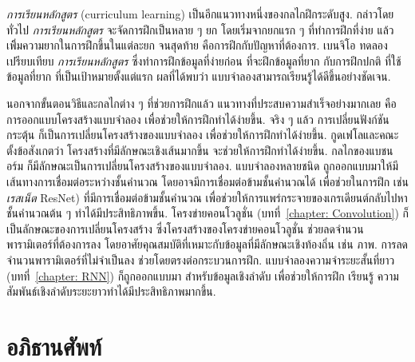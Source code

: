\textit{การเรียนหลักสูตร} (curriculum learning\cite{Bengio2009b}) เป็นอีกแนวทางหนึ่งของกลไกฝึกระดับสูง.
กล่าวโดยทั่วไป
\textit{การเรียนหลักสูตร} จะจัดการฝึกเป็นหลาย ๆ ยก 
โดยเริ่มจากยกแรก ๆ ที่ทำการฝึกที่ง่าย แล้วเพิิ่มความยากในการฝึกขึ้นในแต่ละยก
จนสุดท้าย คือการฝึกกับปัญหาที่ต้องการ.
เบนจิโอ\cite{Bengio2009b}
ทดลองเปรียบเทียบ
\textit{การเรียนหลักสูตร}
ซึ่งทำการฝึกข้อมูลที่ง่ายก่อน ที่จะฝึกข้อมูลที่ยาก
กับการฝึกปกติ ที่ใช้ข้อมูลที่ยาก ที่เป็นเป้าหมายตั้งแต่แรก
ผลที่ได้พบว่า แบบจำลองสามารถเรียนรู้ได้ดีขึ้นอย่างชัดเจน.

นอกจากขั้นตอนวิธีและกลไกต่าง ๆ ที่ช่วยการฝึกแล้ว
แนวทางที่ประสบความสำเร็จอย่างมากเลย 
คือ การออกแบบโครงสร้างแบบจำลอง เพื่อช่วยให้การฝึกทำได้ง่ายขึ้น.
จริง ๆ แล้ว การเปลี่ยนฟังก์ชันกระตุ้น ก็เป็นการเปลี่ยนโครงสร้างของแบบจำลอง
เพื่อช่วยให้การฝึกทำได้ง่ายขึ้น.
กูดเฟโลและคณะ\cite{GoodfellowEtAl2016}
ตั้งข้อสังเกตว่า
โครงสร้างที่มีลักษณะเชิงเส้นมากขึ้น จะช่วยให้การฝึกทำได้ง่ายขึ้น.
กลไกของแบชนอร์ม ก็มีลักษณะเป็นการเปลี่ยนโครงสร้างของแบบจำลอง.
แบบจำลองหลายชนิด ถูกออกแบบมาให้มีเส้นทางการเชื่อมต่อระหว่างชั้นคำนวณ โดยอาจมีการเชื่อมต่อข้ามชั้นคำนวณได้
เพื่อช่วยในการฝึก
เช่น \textit{เรสเน็ต} ResNet\cite{He_2016_CVPR})
ที่มีการเชื่อมต่อข้ามชั้นคำนวณ
เพื่อช่วยให้การแพร่กระจายของเกรเดียนต์กลับไปหาชั้นคำนวณต้น ๆ ทำได้มีประสิทธิภาพขึ้น.
โครงข่ายคอนโวลูชั่น (บทที่~\ref{chapter: Convolution})
ก็เป็นลักษณะของการเปลี่ยนโครงสร้าง ซึ่งโครงสร้างของโครงข่ายคอนโวลูชั่น
ช่วยลดจำนวนพารามิเตอร์ที่ต้องการลง โดยอาศัยคุณสมบัติที่เหมาะกับข้อมูลที่มีลักษณะเชิงท้องถิ่น เช่น ภาพ.
การลดจำนวนพารามิเตอร์ที่ไม่จำเป็นลง ช่วยโดยตรงต่อกระบวนการฝึก.
แบบจำลองความจำระยะสั้นที่ยาว (บทที่~\ref{chapter: RNN})
ก็ถูกออกแบบมา
สำหรับข้อมูลเชิงลำดับ เพื่อช่วยให้การฝึก เรียนรู้ ความสัมพันธ์เชิงลำดับระยะยาวทำได้มีประสิทธิภาพมากขึ้น.



\section{อภิธานศัพท์}


